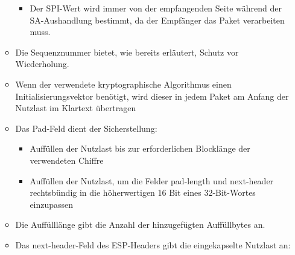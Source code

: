 \documentclass[a4paper]{article}
\begin{document}
\begin{multicols}{3}
\begin{itemize}
\begin{itemize}
                        \begin{itemize}
                            \item
                                  Der SPI-Wert wird immer von der empfangenden Seite während der
                                  SA-Aushandlung bestimmt, da der Empfänger das Paket verarbeiten
                                  muss.
                        \end{itemize}
                  \item
                        Die Sequenznummer bietet, wie bereits erläutert, Schutz vor
                        Wiederholung.
                  \item
                        Wenn der verwendete kryptographische Algorithmus einen
                        Initialisierungsvektor benötigt, wird dieser in jedem Paket am
                        Anfang der Nutzlast im Klartext übertragen
                  \item
                        Das Pad-Feld dient der Sicherstellung:

                        \begin{itemize}
                            \item
                                  Auffüllen der Nutzlast bis zur erforderlichen Blocklänge der
                                  verwendeten Chiffre
                            \item
                                  Auffüllen der Nutzlast, um die Felder pad-length und next-header
                                  rechtsbündig in die höherwertigen 16 Bit eines 32-Bit-Wortes
                                  einzupassen
                        \end{itemize}
                  \item
                        Die Auffülllänge gibt die Anzahl der hinzugefügten Auffüllbytes an.
                  \item
                        Das next-header-Feld des ESP-Headers gibt die eingekapselte Nutzlast
                        an:


\end{itemize}
\end{itemize}
\end{multicols}
\end{document}
